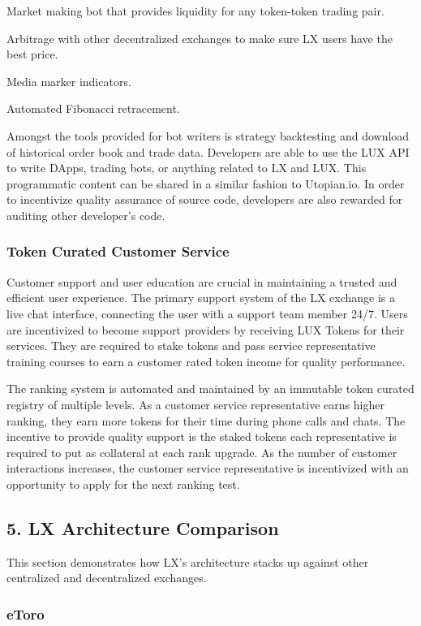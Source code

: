 \documentclass[11pt]{article}
\begin{document}
Market making bot that provides liquidity for any token-token trading pair.


Arbitrage with other decentralized exchanges to make sure LX users have the best price.


Media marker indicators.


Automated Fibonacci retracement.


Amongst the tools provided for bot writers is strategy backtesting and download of historical order book and trade data. Developers are able to use the LUX API to write DApps, trading bots, or anything related to LX and LUX. This programmatic content can be shared in a similar fashion to Utopian.io.  In order to incentivize quality assurance of source code, developers are also rewarded for auditing other developer's code.


\subsubsection{Token Curated Customer Service}

Customer support and user education are crucial in maintaining a trusted and efficient user experience. The primary support system of the LX exchange is a live chat interface, connecting the user with a support team member 24/7. Users are incentivized to become support providers by receiving LUX Tokens for their services. They are required to stake tokens and pass service representative training courses to earn a customer rated token income for quality performance.


The ranking system is automated and maintained by an immutable token curated registry of multiple levels. As a customer service representative earns higher ranking, they earn more tokens for their time during phone calls and chats. The incentive to provide quality support is the staked tokens each representative is required to put as collateral at each rank upgrade. As the number of customer interactions increases, the customer service representative is incentivized with an opportunity to apply for the next ranking test.


\subsection{5. LX Architecture Comparison}

This section demonstrates how LX's architecture stacks up against other centralized and decentralized exchanges.


\subsubsection{eToro}
\end{document}
